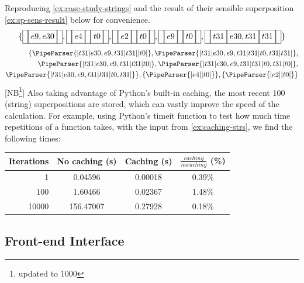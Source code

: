 \documentclass[a4paper,12pt,leqno]{article}
\newcommand{\vph}[1]{\vphantom{#1}}
\newcommand{\ebox}[1]{\fbox{$\vph{'(),}#1$}}
\newcommand{\nbBefore}[2]{\ebox{#1}\ebox{}\ebox{#2}}
\newcommand{\nbDuring}[2]{\ebox{#2}\ebox{#1,#2}\ebox{#2}}
\newcommand{\nbEquals}[2]{\ebox{#1,#2}}
\newcommand{\Before}[2]{\ebox{}\nbBefore{#1}{#2}\ebox{}}
\newcommand{\During}[2]{\ebox{}\nbDuring{#1}{#2}\ebox{}}
\newcommand{\Equals}[2]{\ebox{}\nbEquals{#1}{#2}\ebox{}}
\newcommand{\EventString}[1]{%
	\renewcommand*{\do}[1]{\ebox{##1}}%
	\PipeParser{#1}%
}
\newcommand{\nb}[1]{{\color{red}[NB\footnote{{\color{red}#1}}]}}
\begin{document}
Reproducing \cref{ex:case-study-strings} and the result of their sensible superposition \cref{ex:sp-sens-result} below for convenience.
\begin{align}
	\{\Equals{e9}{e30}, \Before{e4}{t0}, \Before{e2}{t0}, \Before{e9}{t0}, \During{e30}{t31}\}\label{ex:caching-strs}
\end{align}
\begin{align}
	\{\EventString{{}|t31|e30,e9,t31|t31|{}|t0|{}}, \EventString{{}|t31|e30,e9,t31|t31|t0,t31|t31|{}},\\
	\EventString{{}|t31|e30,e9,t31|t31|t0|{}}, \EventString{{}|t31|e30,e9,t31|t31|t0,t31|t0|{}},\notag\\
	\EventString{{}|t31|e30,e9,t31|t31|t0,t31|{}}\}, \{\EventString{{}|e4|{}|t0|{}}\}, \{\EventString{{}|e2|{}|t0|{}}\}\notag
\end{align}
\nb{updated to 1000}
Also taking advantage of Python's built-in caching, the most recent 100 (string) superpositions are stored, which can vastly improve the speed of the calculation. For example, using Python's timeit function to test how much time repetitions of a function takes, with the input from \cref{ex:caching-strs}, we find the following times:
\begin{center}
	\footnotesize
	\begin{tabular}[h!]{|r|c  c  c|}
		\hline
		Iterations & No caching (s) & Caching (s) & $\frac{caching}{no caching}$ (\%)\\
		\hline
		1 & 0.04596 & 0.00018 & 0.39\%\\
		100 & 1.60466 & 0.02367 & 1.48\%\\%
		10000 & 156.47007 & 0.27928 & 0.18\%\\%
		\hline
	\end{tabular}
\end{center}
\subsection{Front-end Interface}\label{sub:frontend}
\end{document}
